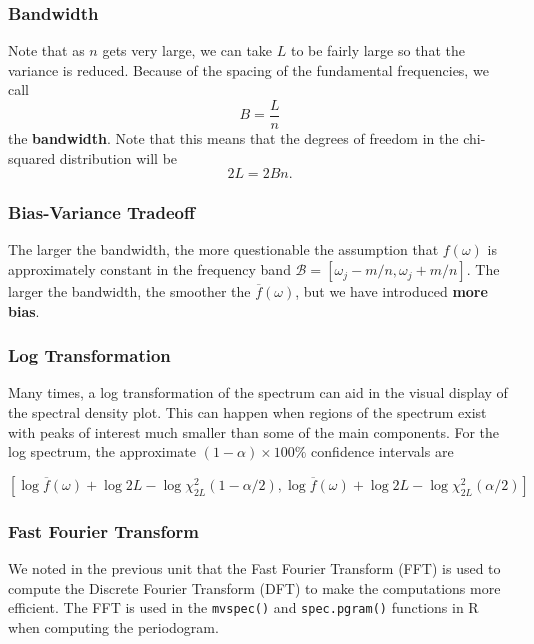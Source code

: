 \documentclass[%
xcolor=pdftex]{beamer}
\begin{document}
\begin{frame}
\frametitle{Bandwidth}

Note that as $n$ gets very large, we can take $L$ to be fairly
large so that the variance is reduced. Because of the spacing of the fundamental
frequencies, we call
\begin{equation} \label{eq:bandwidth}
B=\frac{L}{n}
\end{equation}
the \textbf{bandwidth}. Note that this means that the degrees of freedom
in the chi-squared distribution will be
$$
2L=2 B n.
$$

\end{frame}

\begin{frame}
\frametitle{Bias-Variance Tradeoff}

%
The larger the bandwidth, the more questionable the assumption that $f(\omega)$ is approximately constant in the frequency band $\mathcal{B}=[\omega_j-m/n, \omega_j+m/n]$. The larger the bandwidth, the smoother the $\overline{f}(\omega)$, but we have introduced \textbf{more bias}.

\end{frame}

\begin{frame}
\frametitle{Log Transformation}

Many times, a log transformation of the spectrum can aid in the visual display of the spectral density plot. This can happen when regions of the spectrum exist with peaks of interest much smaller than some of the main components. For the log spectrum, the approximate $(1-\alpha) \times 100\%$ confidence intervals are

\begin{equation} \label{eq:CIlog}
[ \log \overline{f}(\omega)  + \log 2L  - \log \chi_{2L}^2(1-\alpha/2) , \log \overline{f}(\omega) + \log 2L - \log \chi_{2L}^2(\alpha/2) ]
\end{equation}

\end{frame}

\begin{frame} [fragile]
\frametitle{Fast Fourier Transform}

We noted in the previous unit that the Fast Fourier Transform (FFT) is used to compute the Discrete Fourier Transform (DFT) to make the computations more efficient. The FFT is used in the \verb=mvspec()= and \verb=spec.pgram()= functions in R when computing the periodogram.



\end{frame}
\end{document}

